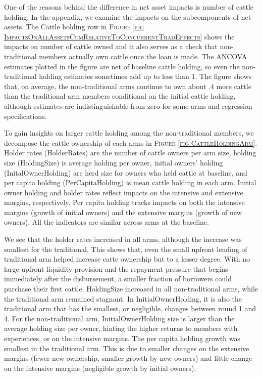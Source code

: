 	One of the reasons behind the difference in net asset impacts is number of cattle holding. 	In the appendix, we examine the impacts on the subcomponents of net assets. The \textsf{Cattle holding} row in \textsc{\footnotesize Figure \ref{fig ImpactsOnAllAssetsCumRelativeToConcurrentTradEffects}} shows the impacts on number of cattle owned and it also serves as a check that non-\textsf{traditional} members actually own cattle once the loan is made. The ANCOVA estimates plotted in the figure are net of baseline cattle holding, so even the non-traditional holding estimates sometimes add up to less than 1. %
	The figure shows that, on average, the non-\textsf{traditional} arms continue to own about .4 more cattle than the \textsf{traditional} arm members conditional on the initial cattle holding, although estimates are indistinguishable from zero for some arms and regression specifications. 

	To gain insights on larger cattle holding among the non-\textsf{traditional} members, we decompose the cattle ownership of each arms in \textsc{\footnotesize Figure \ref{fig CattleHoldingArm}}. Holder rates (\textsf{HolderRates}) are the number of cattle owners per arm size, holding size (\textsf{HoldingSize}) is average holding per owner, initial owners' holding (\textsf{InitalOwnerHolding}) are herd size for owners who held cattle at baseline, and per capita holding (\textsf{PerCapitaHolding}) is mean cattle holding in each arm. Initial owner holding and holder rates reflect impacts on the intensive and extensive margins, respectively. Per capita holding tracks impacts on both the intensive margins (growth of initial owners) and the extensive margins (growth of new owners). All the indicators are similar across arms at the baseline. 
	
	We see that the holder rates increased in all arms, although the increase was smallest for the \textsf{traditional}. This shows that, even the small upfront lending of \textsf{traditional} arm helped increase catte ownership but to a lesser degree. With no large upfront liquidity provision and the repayment pressure that begins immediately after the disbursement, a smaller fraction of borrowers could purchase their first cattle. \textsf{HoldingSize} increased in all non-\textsf{traditional} arms, while the \textsf{traditional} arm remained stagnant. In \textsf{InitialOwnerHolding}, it is also the \textsf{traditional} arm that has the smallest, or negligible, changes between round 1 and 4. For the non-\textsf{traditional} arm, \textsf{InitialOwnerHolding} size is larger than the average holding size per owner, hinting the higher returns to members with experiences, or on the intensive margins. The per capita holding growth was smallest in the \textsf{traditional} arm. This is due to smaller changes on the extensive margins (fewer new ownership, smaller growth by new owners) and little change on the intensive margins (negligible growth by initial owners). 

